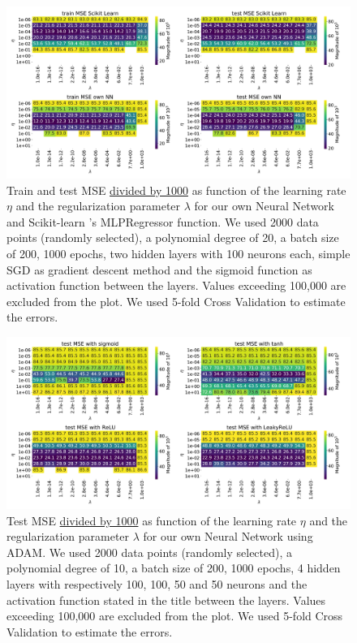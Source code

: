 \documentclass[11pt,a4paper,titlepage]{article}
\begin{document}
\begin{figure}[H]
\centering
\includegraphics[width=1.05\textwidth]{scikit_own_2b1_logisticsgd200010.pdf}
\caption[Scikit-learn  and own FFNN with 2 layers, degree 20]{Train and test MSE \underline{divided by 1000} as function of the learning rate $\eta$ and the regularization parameter $\lambda$ for our own Neural Network and Scikit-learn 's MLPRegressor function. We used 2000 data points (randomly selected), a polynomial degree of 20, a batch size of 200, 1000 epochs, two hidden layers with 100 neurons each, simple SGD as gradient descent method and the sigmoid function as activation function between the layers. Values exceeding 100,000 are excluded from the plot. We used 5-fold Cross Validation to estimate the errors.} \label{fig:ScikitLearn_3}
\end{figure}
\begin{figure}[H]
\centering
\includegraphics[width=1.0\textwidth]{4_layers.pdf}
\caption[4 hidden layers, 100 epochs]{Test MSE \underline{divided by 1000} as function of the learning rate $\eta$ and the regularization parameter $\lambda$ for our own Neural Network using ADAM. We used 2000 data points (randomly selected), a polynomial degree of 10, a batch size of 200, 1000 epochs, 4 hidden layers with respectively 100, 100, 50 and 50 neurons and the activation function stated in the title between the layers. Values exceeding 100,000 are excluded from the plot. We used 5-fold Cross Validation to estimate the errors.} \label{fig:4layers}
\end{figure}
\end{document}
